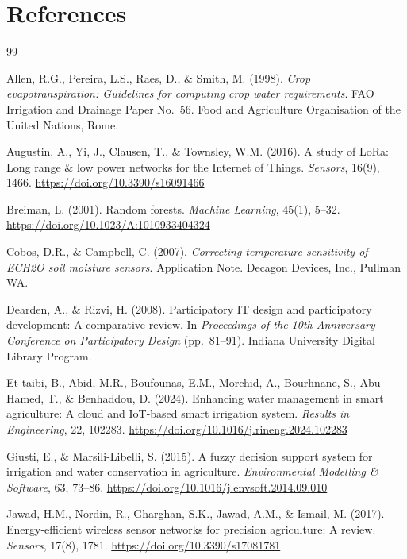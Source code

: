\documentclass[12pt,a4paper]{report}
\begin{document}
\chapter*{References}

\begin{thebibliography}{99}

Allen, R.G., Pereira, L.S., Raes, D., \& Smith, M. (1998).
\textit{Crop evapotranspiration: Guidelines for computing crop water requirements}.
FAO Irrigation and Drainage Paper No.~56. Food and Agriculture Organisation of the United Nations, Rome.

Augustin, A., Yi, J., Clausen, T., \& Townsley, W.M. (2016).
A study of LoRa: Long range \& low power networks for the Internet of Things.
\textit{Sensors}, 16(9), 1466. \url{https://doi.org/10.3390/s16091466}

Breiman, L. (2001). Random forests.
\textit{Machine Learning}, 45(1), 5--32. \url{https://doi.org/10.1023/A:1010933404324}

Cobos, D.R., \& Campbell, C. (2007).
\textit{Correcting temperature sensitivity of ECH2O soil moisture sensors}.
Application Note. Decagon Devices, Inc., Pullman WA.

Dearden, A., \& Rizvi, H. (2008).
Participatory IT design and participatory development: A comparative review.
In \textit{Proceedings of the 10th Anniversary Conference on Participatory Design} (pp.\ 81--91).
Indiana University Digital Library Program.

Et-taibi, B., Abid, M.R., Boufounas, E.M., Morchid, A., Bourhnane, S.,
Abu Hamed, T., \& Benhaddou, D. (2024).
Enhancing water management in smart agriculture: A cloud and IoT-based smart irrigation system.
\textit{Results in Engineering}, 22, 102283.
\url{https://doi.org/10.1016/j.rineng.2024.102283}

Giusti, E., \& Marsili-Libelli, S. (2015).
A fuzzy decision support system for irrigation and water conservation in agriculture.
\textit{Environmental Modelling \& Software}, 63, 73--86.
\url{https://doi.org/10.1016/j.envsoft.2014.09.010}

Jawad, H.M., Nordin, R., Gharghan, S.K., Jawad, A.M., \& Ismail, M. (2017).
Energy-efficient wireless sensor networks for precision agriculture: A review.
\textit{Sensors}, 17(8), 1781. \url{https://doi.org/10.3390/s17081781}


\end{thebibliography}
\end{document}

